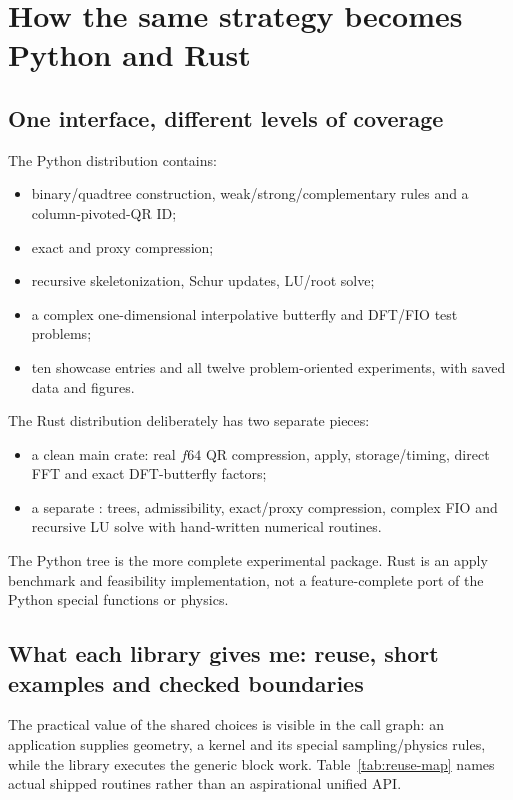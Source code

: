 \section{How the same strategy becomes Python and Rust}
\label{sec:implementations}

\subsection{One interface, different levels of coverage}
The Python distribution  contains:
\begin{itemize}
 \item binary/quadtree construction, weak/strong/complementary rules and a column-pivoted-QR ID;
 \item exact and proxy compression;
 \item recursive skeletonization, Schur updates, LU/root solve;
 \item a complex one-dimensional interpolative butterfly and DFT/FIO test problems;
 \item ten showcase entries and all twelve problem-oriented experiments, with saved data and figures.
\end{itemize}
The Rust distribution  deliberately has two separate pieces:
\begin{itemize}
 \item a clean main crate: real $f64$ QR compression, apply, storage/timing, direct FFT and exact DFT-butterfly factors;
 \item a separate : trees, admissibility, exact/proxy compression, complex FIO and recursive LU solve with hand-written numerical routines.
\end{itemize}
The Python tree is the more complete experimental package. Rust is an apply benchmark and feasibility implementation, not a feature-complete port of the Python special functions or physics.

\subsection{What each library gives me: reuse, short examples and checked boundaries}
The practical value of the shared choices is visible in the call graph: an application supplies geometry, a kernel and its special sampling/physics rules, while the library executes the generic block work. Table~\ref{tab:reuse-map} names actual shipped routines rather than an aspirational unified API.

